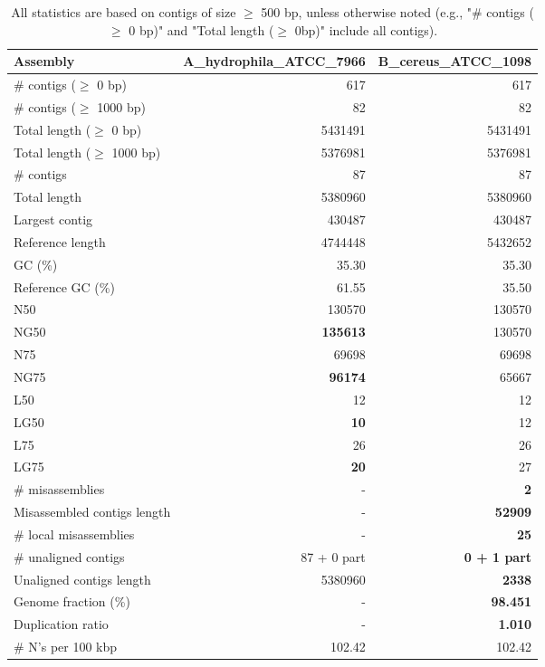 \documentclass[12pt,a4paper]{article}
\begin{document}
\begin{table}[ht]
\begin{center}
\caption{All statistics are based on contigs of size $\geq$ 500 bp, unless otherwise noted (e.g., "\# contigs ($\geq$ 0 bp)" and "Total length ($\geq$ 0bp)" include all contigs).}
\begin{tabular}{|l*{2}{|r}|}
\hline
Assembly & A\_hydrophila\_ATCC\_7966 & B\_cereus\_ATCC\_1098 \\ \hline
\# contigs ($\geq$ 0 bp) & 617 & 617 \\ \hline
\# contigs ($\geq$ 1000 bp) & 82 & 82 \\ \hline
Total length ($\geq$ 0 bp) & 5431491 & 5431491 \\ \hline
Total length ($\geq$ 1000 bp) & 5376981 & 5376981 \\ \hline
\# contigs & 87 & 87 \\ \hline
Total length & 5380960 & 5380960 \\ \hline
Largest contig & 430487 & 430487 \\ \hline
Reference length & 4744448 & 5432652 \\ \hline
GC (\%) & 35.30 & 35.30 \\ \hline
Reference GC (\%) & 61.55 & 35.50 \\ \hline
N50 & 130570 & 130570 \\ \hline
NG50 & {\bf 135613} & 130570 \\ \hline
N75 & 69698 & 69698 \\ \hline
NG75 & {\bf 96174} & 65667 \\ \hline
L50 & 12 & 12 \\ \hline
LG50 & {\bf 10} & 12 \\ \hline
L75 & 26 & 26 \\ \hline
LG75 & {\bf 20} & 27 \\ \hline
\# misassemblies & - & {\bf 2} \\ \hline
Misassembled contigs length & - & {\bf 52909} \\ \hline
\# local misassemblies & - & {\bf 25} \\ \hline
\# unaligned contigs & 87 + 0 part & {\bf 0 + 1 part} \\ \hline
Unaligned contigs length & 5380960 & {\bf 2338} \\ \hline
Genome fraction (\%) & - & {\bf 98.451} \\ \hline
Duplication ratio & - & {\bf 1.010} \\ \hline
\# N's per 100 kbp & 102.42 & 102.42 \\ \hline

\end{tabular}
\end{center}
\end{table}
\end{document}
